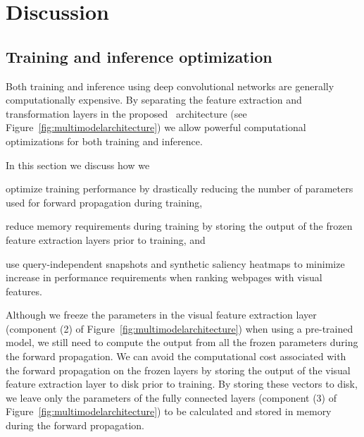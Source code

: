 
\section{Discussion}
\label{sec:discussion}


\subsection{Training and inference optimization} \label{sec:sectionoptimalization}
Both training and inference using deep convolutional networks are generally computationally expensive.
By separating the feature extraction and transformation layers in the proposed \modelname~architecture (see Figure~\ref{fig:multimodelarchitecture}) we allow powerful computational optimizations for both training and inference. 

In this section we discuss how we 
\begin{inparaenum}[(i)]
    \item optimize training performance by drastically reducing the number of parameters used for forward propagation during training, 
    \item reduce memory requirements during training by storing the output of the frozen feature extraction layers prior to training, and
    \item use query-independent snapshots and synthetic saliency heatmaps to minimize increase in performance requirements when ranking webpages with visual features.
\end{inparaenum}
\fi

Although we freeze the parameters in the visual feature extraction layer (component (2) of Figure~\ref{fig:multimodelarchitecture}) when using a pre-trained model, we still need to compute the output from all the frozen parameters during the forward propagation.
We can avoid the computational cost associated with the forward propagation on the frozen layers by storing the output of the visual feature extraction layer to disk prior to training.
By storing these vectors to disk, we leave only the parameters of the fully connected layers (component (3) of Figure~\ref{fig:multimodelarchitecture}) to be calculated and stored in memory during the forward propagation. 

